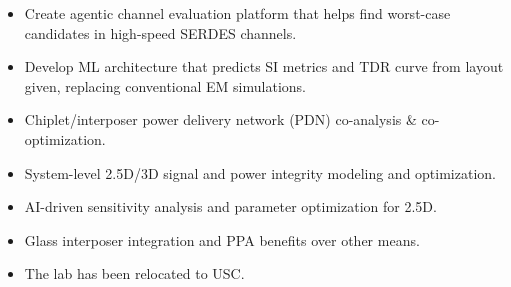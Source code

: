 



\begin{itemize}
    \item Create agentic channel evaluation platform that helps find worst-case candidates in high-speed SERDES channels.
    \item Develop ML architecture that predicts SI metrics and TDR curve from layout given, replacing conventional EM simulations.
\end{itemize}

\vspace{-5pt}
\divider
\vspace{-2.5pt}

\begin{itemize}
    \item Chiplet/interposer power delivery network (PDN) co-analysis \& co-optimization.
    \item System-level 2.5D/3D signal and power integrity modeling and optimization.
\end{itemize}

\vspace{-5pt}
\divider
\vspace{-2.5pt}

\begin{itemize}
    \item AI-driven sensitivity analysis and parameter optimization for 2.5D.
    \item Glass interposer integration and PPA benefits over other means. 
    \item The lab has been relocated to USC.
\end{itemize}

\vspace{-5pt}
\divider
\vspace{-2.5pt}

